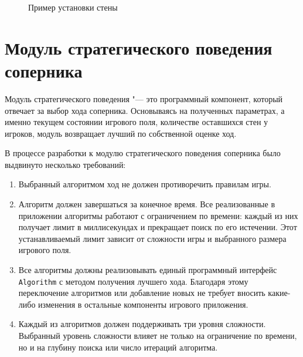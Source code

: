 \documentclass[a4paper,12pt]{diplom}
\begin{document}
\begin{figure}[h]
    \centering
    \caption{Пример установки стены}
    \label{fig:rules_wall}
\end{figure}

\chapter{Модуль стратегического поведения соперника}

Модуль стратегического поведения "--- это программный компонент, который отвечает за выбор хода соперника. Основываясь на полученных параметрах, а именно текущем состоянии игрового поля, количестве оставшихся стен у игроков, модуль возвращает лучший по собственной оценке ход.

В процессе разработки к модулю стратегического поведения соперника было выдвинуто несколько требований:

\begin{enumerate}
    \item Выбранный алгоритмом ход не должен противоречить правилам игры.
    \item Алгоритм должен завершаться за конечное время. Все реализованные в приложении алгоритмы работают с ограничением по времени: каждый из них получает лимит в миллисекундах и прекращает поиск по его истечении. Этот устанавливаемый лимит зависит от сложности игры и выбранного размера игрового поля.
    \item Все алгоритмы должны реализовывать единый программный интерфейс \texttt{Algorithm} с методом получения лучшего хода. Благодаря этому переключение алгоритмов или добавление новых не требует вносить какие-либо изменения в остальные компоненты игрового приложения.
    \item Каждый из алгоритмов должен поддерживать три уровня сложности. Выбранный уровень сложности влияет не только на ограничение по времени, но и на глубину поиска или число итераций алгоритма.
\end{enumerate}
\end{document}
